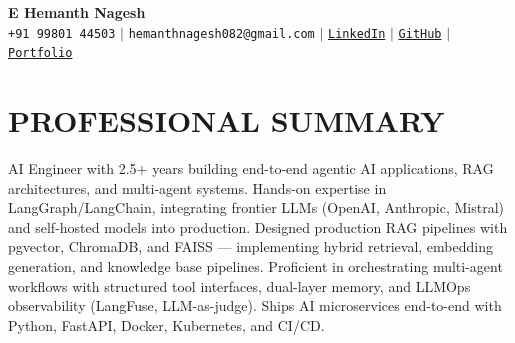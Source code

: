 \documentclass[letterpaper,10pt]{article}
\begin{document}
\begin{center}
    \textbf{\Huge E Hemanth Nagesh} \\ \vspace{5pt}
    \small 
    \faPhone* \texttt{+91 99801 44503} \hspace{1pt} $|$     \hspace{1pt} \faEnvelope \hspace{2pt} \texttt{hemanthnagesh082@gmail.com} \hspace{1pt} $|$ 
    \hspace{1pt} \faLinkedin \hspace{2pt} \href{https://linkedin.com/in/e-hemanth-nagesh}{\texttt{LinkedIn}} $|$
    \faGithub \hspace{2pt} \href{https://github.com/hemanth-nagesh}{\texttt{GitHub}} \hspace{1pt} $|$     \hspace{1pt} \faGlobe \hspace{2pt} \href{https://portfolio-ehn.netlify.app/}{\texttt{Portfolio}}
    \\ \vspace{-3pt}
\end{center}

\section{PROFESSIONAL SUMMARY}
\small
AI Engineer with 2.5+ years building end-to-end agentic AI applications, RAG architectures, and multi-agent systems. Hands-on expertise in LangGraph/LangChain, integrating frontier LLMs (OpenAI, Anthropic, Mistral) and self-hosted models into production. Designed production RAG pipelines with pgvector, ChromaDB, and FAISS — implementing hybrid retrieval, embedding generation, and knowledge base pipelines. Proficient in orchestrating multi-agent workflows with structured tool interfaces, dual-layer memory, and LLMOps observability (LangFuse, LLM-as-judge). Ships AI microservices end-to-end with Python, FastAPI, Docker, Kubernetes, and CI/CD.
\vspace{-6pt}

\end{document}
